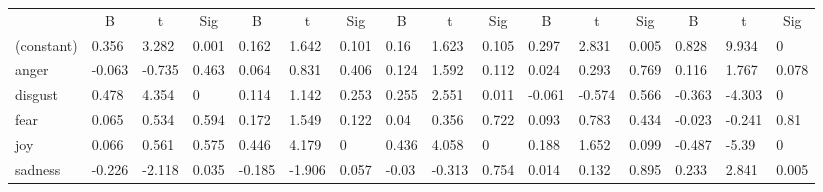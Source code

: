 \documentclass[graybox]{svmult}
\begin{document}
{\begin{table}[!ht]
{\begin{tabular}{@{}llll|lll|lll|lll|lll@{}}
\midrule
           
& \multicolumn{1}{c}{B} & \multicolumn{1}{c}{t} &
\multicolumn{1}{c}{Sig} & \multicolumn{1}{c}{B} &
\multicolumn{1}{c}{t} & \multicolumn{1}{c}{Sig} &
\multicolumn{1}{c}{B} & \multicolumn{1}{c}{t} &
\multicolumn{1}{c}{Sig} & \multicolumn{1}{c}{B} &
\multicolumn{1}{c}{t} & \multicolumn{1}{c}{Sig} &
\multicolumn{1}{c}{B} & \multicolumn{1}{c}{t} &
\multicolumn{1}{c}{Sig} \\


(constant) & 0.356                 & 3.282                 & 0.001                   & 0.162                 & 1.642                 & 0.101                   & 0.16                  & 1.623                 & 0.105                   & 0.297      & 2.831     & 0.005    & 0.828          & 9.934   & 0      \\
anger      & -0.063                & -0.735                & 0.463                   & 0.064                 & 0.831                 & 0.406                   & 0.124                 & 1.592                 & 0.112                   & 0.024      & 0.293     & 0.769    & 0.116          & 1.767    & 0.078     \\
disgust    & 0.478                 & 4.354                 & 0                       & 0.114                 & 1.142                 & 0.253                   & 0.255                 & 2.551                 & 0.011                   & -0.061     & -0.574    & 0.566    & -0.363         & -4.303    & 0    \\
fear       & 0.065                 & 0.534                 & 0.594                   & 0.172                 & 1.549                 & 0.122                   & 0.04                  & 0.356                 & 0.722                   & 0.093      & 0.783     & 0.434    & -0.023         & -0.241    & 0.81    \\
joy        & 0.066                 & 0.561                 & 0.575                   & 0.446                 & 4.179                 & 0                       & 0.436                 & 4.058                 & 0                       & 0.188      & 1.652     & 0.099    & -0.487         & -5.39   & 0      \\
sadness    & -0.226                & -2.118                & 0.035                   & -0.185                & -1.906                & 0.057                   & -0.03                 & -0.313                & 0.754                   & 0.014      & 0.132     & 0.895    & 0.233          & 2.841     & 0.005    \\


\end{tabular}}
\end{table}}
\end{document}
